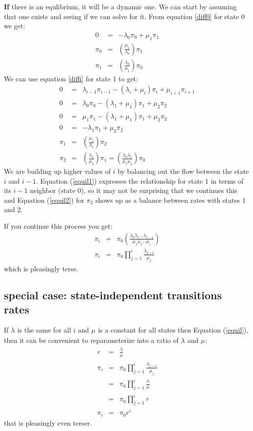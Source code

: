 \documentclass[11pt]{article}
\newcommand{\birth}[1]{\lambda_{#1}}
\newcommand{\death}[1]{\mu_{#1}}
\begin{document}
{\bf If} there is an equlibrium, it will be a dynamic one.
We can start by assuming that one exists and seeing if we can solve for it.
From equation \ref{diff0} for state 0 we get:
\begin{eqnarray}
    0 & = & -\birth{0} \pi_0 + \death{1} \pi_1 \\
    \pi_0 & = & \left(\frac{\death{1}}{\birth{0} }\right)\pi_1 \\
    \pi_1 & = & \left(\frac{\birth{0}}{\death{1}}\right)\pi_0 \label{equil1}
\end{eqnarray}
We can use equation \ref{diffi} for state 1 to get:
\begin{eqnarray}
    0 & = & \birth{i-1} \pi_{i-1} -\left(\birth{i} + \death{i}\right)  \pi_{i}  + \death{i+1}  \pi_{i+1}\\
    0 & = & \birth{0} \pi_{0} -\left(\birth{1} + \death{1}\right)  \pi_{1}  + \death{2}  \pi_{2}\\
    0 & = & \death{1}\pi_1 -\left(\birth{1} + \death{1}\right)  \pi_{1}  + \death{2}  \pi_{2}\\
    0 & = & -\birth{1}\pi_{1}  + \death{2}  \pi_{2}\\
    \pi_1 & = & \left(\frac{\death{2}}{\birth{1} }\right)\pi_2 \\
    \pi_2 & = & \left(\frac{\birth{1}}{\death{2}}\right)\pi_1 = \left(\frac{\birth{0}\birth{1}}{\death{1}\death{2}}\right)\pi_0 \label{equil2}
\end{eqnarray}
We are building up higher values of $i$ by balancing
out the flow between the state $i$ and $i-1$.
Equation (\ref{equil1}) expresses the relationship for state 1 in terms of its $i-1$ neighbor (state 0), 
so it may not be surprising that we continues this and Equation (\ref{equil2})  for $\pi_2$ shows up as a balance between rates with states 1 and 2.

If you continue this process you get:
\begin{eqnarray}
    \pi_i & = & \pi_0 \left(\frac{\birth{0}\birth{1}\ldots\birth{i-1}}{\death{1}\death{2}\ldots\death{i}}\right)\\
   \pi_i & = & \pi_0 \prod_{j=1}^{i}\frac{\birth{j-1}}{\death{j}}\label{equil}
\end{eqnarray}
which is pleasingly terse.


\subsection{special case: state-independent transitions rates}
If $\birth{}$ is the same for all $i$ and $\death{}$ is a constant for all states then Equation (\ref{equil}), then it can be convenient to reparameterize into a ratio of $\birth{}$ and $\death{}$:
\begin{eqnarray}
    r & = & \frac{\birth{}}{\death{}} \\
   \pi_i & = & \pi_0 \prod_{j=1}^{i}\frac{\birth{j-1}}{\death{j}} \\
   & = & \pi_0 \prod_{j=1}^{i}\frac{\birth{}}{\death{}} \\
   & = & \pi_0 \prod_{j=1}^{i}r \\
   \pi_i& = & \pi_0 r^{i}  \label{equilc}
\end{eqnarray}
that is pleasingly even terser.
\end{document}
